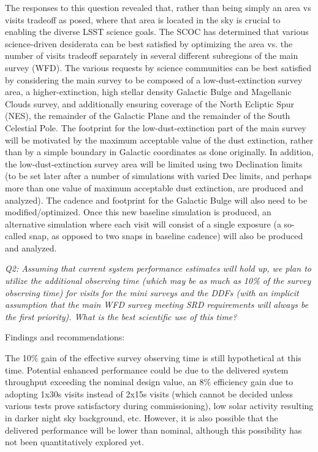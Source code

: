 The responses to this question revealed that, rather than being simply an area vs visits tradeoff as posed, where that area is located in the sky is crucial to enabling the diverse LSST science goals. The SCOC has determined that various science-driven desiderata can be best satisfied by optimizing the area vs. the number of visits tradeoff separately in several different subregions of the main survey (WFD). The various requests by science communities can be best satisfied by considering the main survey to be composed of a low-dust-extinction survey area, a higher-extinction, high stellar density Galactic Bulge and Magellanic Clouds survey, and additionally ensuring coverage of the North Ecliptic Spur (NES), the remainder of the Galactic Plane and the remainder of the South Celestial Pole. The footprint for the low-dust-extinction part of the main survey will be motivated by the maximum acceptable value of the dust extinction, rather than by a simple boundary in Galactic coordinates as done originally. In addition, the low-dust-extinction survey area will be limited using two Declination limits (to be set later after a number of simulations with varied Dec limits, and perhaps more than one value of maximum acceptable dust extinction, are produced and analyzed). The cadence and footprint for the Galactic Bulge will also need to be modified/optimized. Once this new baseline simulation is produced, an alternative simulation where each visit will consist of a single exposure (a so-called snap, as opposed to two snaps in baseline cadence) will also be produced and analyzed.


{\it Q2: Assuming that current system performance estimates will hold up, we plan to utilize the additional observing time (which may be as much as 10\% of the survey observing time) for visits for the mini surveys and the DDFs (with an implicit assumption that the main WFD survey meeting SRD requirements will always be the first priority). What is the best scientific use of this time? }

Findings and recommendations:
 
The 10\% gain of the effective survey observing time is still hypothetical at this time. Potential
enhanced performance could be due to the delivered system throughput exceeding the nominal design value, an 8\% efficiency gain due to adopting 1x30s visits instead of 2x15s visits (which cannot be decided unless various tests prove satisfactory during commissioning), low solar activity resulting in darker night sky background, etc. However, it is also possible that the delivered performance will be lower than nominal, although this possibility has not been quantitatively explored yet.

